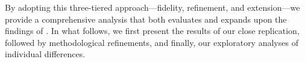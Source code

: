 By adopting this three-tiered approach—fidelity, refinement, and extension—we provide a comprehensive analysis that both evaluates and expands upon the findings of \cite{Ge2021}. In what follows, we first present the results of our close replication, followed by methodological refinements, and finally, our exploratory analyses of individual differences.



